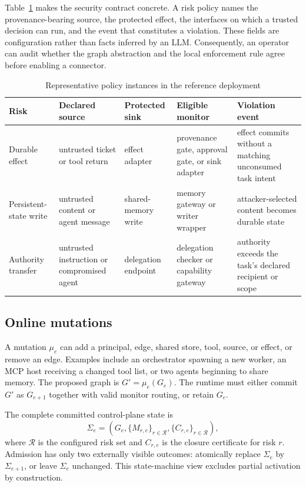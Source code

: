 \documentclass[10pt,journal,compsoc]{IEEEtran}
\begin{document}
Table~\ref{tab:policyinstances} makes the security contract concrete.  A risk
policy names the provenance-bearing source, the protected effect, the
interfaces on which a trusted decision can run, and the event that constitutes
a violation.  These fields are configuration rather than facts inferred by an
LLM.  Consequently, an operator can audit whether the graph abstraction and
the local enforcement rule agree before enabling a connector.

\begin{table}[t]
\caption{Representative policy instances in the reference deployment}
\label{tab:policyinstances}
\centering
\footnotesize
\begin{tabular}{p{2.2cm}p{2.7cm}p{2.8cm}p{2.8cm}p{4.0cm}}
\toprule
Risk & Declared source & Protected sink & Eligible monitor & Violation event \\
\midrule
Durable effect & untrusted ticket or tool return & effect adapter & provenance gate, approval gate, or sink adapter & effect commits without a matching unconsumed task intent \\
Persistent-state write & untrusted content or agent message & shared-memory write & memory gateway or writer wrapper & attacker-selected content becomes durable state \\
Authority transfer & untrusted instruction or compromised agent & delegation endpoint & delegation checker or capability gateway & authority exceeds the task's declared recipient or scope \\
\bottomrule
\end{tabular}
\end{table}

\subsection{Online mutations}

A mutation $\mu_e$ can add a principal, edge, shared store, tool, source, or
effect, or remove an edge.  Examples include an orchestrator spawning a new
worker, an MCP host receiving a changed tool list, or two agents beginning to
share memory.  The proposed graph is
$G' = \mu_e(G_e)$.  The runtime must either commit $G'$ as $G_{e+1}$ together
with valid monitor routing, or retain $G_e$.

The complete committed control-plane state is
\begin{equation}
 \Sigma_e=\left(G_e,\{M_{r,e}\}_{r\in\mathcal{R}},
 \{C_{r,e}\}_{r\in\mathcal{R}}\right),
 \label{eq:epochstate}
\end{equation}
where $\mathcal{R}$ is the configured risk set and $C_{r,e}$ is the closure
certificate for risk $r$.  Admission has only two externally visible outcomes:
atomically replace $\Sigma_e$ by $\Sigma_{e+1}$, or leave $\Sigma_e$ unchanged.
This state-machine view excludes partial activation by construction.
\end{document}
